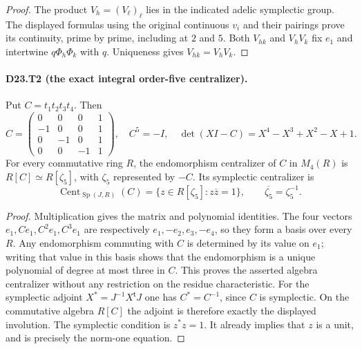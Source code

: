 \begin{proof}
The product $V_h=(V_\ell)_\ell$ lies in the indicated adelic
symplectic group. The displayed formulas using the original
continuous $v_i$ and their pairings prove its continuity, prime by
prime, including at $2$ and $5$. Both $V_{hk}$ and $V_hV_k$ fix
$e_1$ and intertwine $q\Phi_h\Phi_k$ with $q$. Uniqueness gives
$V_{hk}=V_hV_k$.
\end{proof}

\paragraph{D23.T2 (the exact integral order-five centralizer).}
Put $C=t_1t_2t_3t_4$. Then
\[
C=\begin{pmatrix}0&0&0&1\\-1&0&0&1\\0&-1&0&1\\0&0&-1&1\end{pmatrix},
\quad C^5=-I,\quad \det(XI-C)=X^4-X^3+X^2-X+1.
\]
For every commutative ring $R$, the endomorphism centralizer of
$C$ in $M_4(R)$ is $R[C]\simeq R[\zeta_5]$, with
$\zeta_5$ represented by $-C$. Its symplectic centralizer is
\[
\operatorname{Cent}_{\operatorname{Sp}(J,R)}(C)
=\{z\in R[\zeta_5]:z\overline z=1\},
\qquad \overline{\zeta_5}=\zeta_5^{-1}.
\]
\begin{proof}
Multiplication gives the matrix and polynomial identities. The four
vectors $e_1,Ce_1,C^2e_1,C^3e_1$ are respectively
$e_1,-e_2,e_3,-e_4$, so they form a basis over every $R$.
Any endomorphism commuting with $C$ is determined by its value on
$e_1$; writing that value in this basis shows that the endomorphism
is a unique polynomial of degree at most three in $C$. This proves
the asserted algebra centralizer without any restriction on the
residue characteristic.
For the symplectic adjoint $X^*=J^{-1}X^{\mathsf t}J$ one has
$C^*=C^{-1}$, since $C$ is symplectic. On the commutative algebra
$R[C]$ the adjoint is therefore exactly the displayed involution.
The symplectic condition is $z^*z=1$. It already implies that $z$
is a unit, and is precisely the norm-one equation.
\end{proof}
